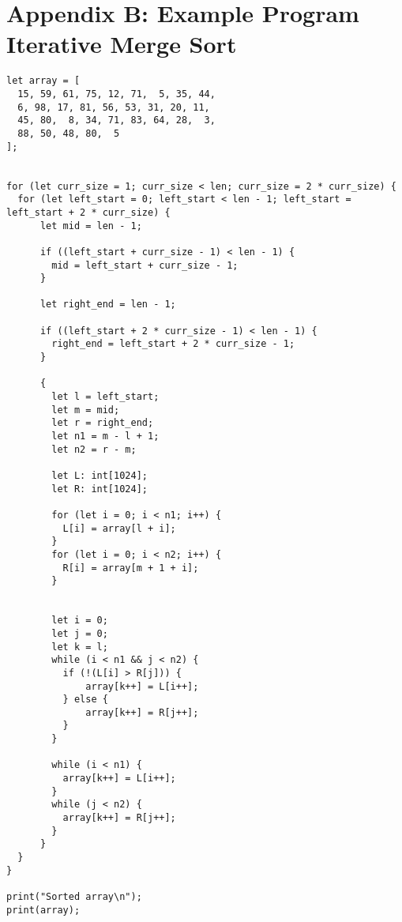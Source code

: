\documentclass[a4paper]{article}
\begin{document}
\clearpage
\section*{Appendix B: Example Program Iterative Merge Sort}

\begin{lstlisting}[language=DPCC]
let array = [
  15, 59, 61, 75, 12, 71,  5, 35, 44,
  6, 98, 17, 81, 56, 53, 31, 20, 11,
  45, 80,  8, 34, 71, 83, 64, 28,  3,
  88, 50, 48, 80,  5
];


for (let curr_size = 1; curr_size < len; curr_size = 2 * curr_size) {
  for (let left_start = 0; left_start < len - 1; left_start = left_start + 2 * curr_size) {
      let mid = len - 1;

      if ((left_start + curr_size - 1) < len - 1) {
        mid = left_start + curr_size - 1;
      }

      let right_end = len - 1;

      if ((left_start + 2 * curr_size - 1) < len - 1) {
        right_end = left_start + 2 * curr_size - 1;
      }

      {
        let l = left_start;
        let m = mid;
        let r = right_end;
        let n1 = m - l + 1;
        let n2 = r - m;

        let L: int[1024];
        let R: int[1024];

        for (let i = 0; i < n1; i++) {
          L[i] = array[l + i];
        }
        for (let i = 0; i < n2; i++) {
          R[i] = array[m + 1 + i];
        }


        let i = 0;
        let j = 0;
        let k = l;
        while (i < n1 && j < n2) {
          if (!(L[i] > R[j])) {
              array[k++] = L[i++];
          } else {
              array[k++] = R[j++];
          }
        }

        while (i < n1) {
          array[k++] = L[i++];
        }
        while (j < n2) {
          array[k++] = R[j++];
        }
      }
  }
}

print("Sorted array\n");
print(array);
\end{lstlisting}


%

%
\end{document}
